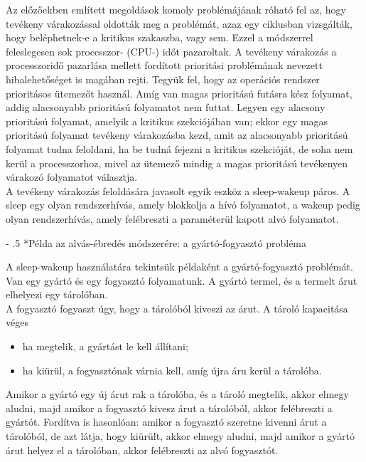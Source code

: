 \documentclass[tikz,12pt,margin=0px]{article}
\makeatletter
\renewcommand\paragraph{%
	\@startsection{paragraph}{4}{0mm}%
	{-\baselineskip}%
	{.5\baselineskip}%
	{\normalfont\normalsize\bfseries}}
\makeatother
\begin{document}
    Az előzőekben említett megoldások komoly problémájának róható fel az, hogy tevékeny várakozással oldották meg a problémát, azaz egy ciklusban vizsgálták, hogy beléphetnek-e a kritikus szakaszba, vagy sem. Ezzel a módszerrel feleslegesen sok processzor- (CPU-) időt pazaroltak. A tevékeny várakozás a processzoridő pazarlása mellett fordított prioritási problémának nevezett hibalehetőséget is magában rejti. Tegyük fel, hogy az operációs rendszer prioritásos ütemezőt használ. Amíg van magas prioritású futásra kész folyamat, addig alacsonyabb prioritású folyamatot nem futtat. Legyen egy alacsony prioritású folyamat, amelyik a kritikus szekciójában van; ekkor egy magas prioritású folyamat tevékeny várakozásba kezd, amit az alacsonyabb prioritású folyamat tudna feloldani, ha be tudná fejezni a kritikus szekcióját, de soha nem kerül a processzorhoz, mivel az ütemező mindig a magas prioritású tevékenyen várakozó folyamatot választja.\\

    \noindent A tevékeny várakozás feloldására javasolt egyik eszköz a sleep-wakeup páros. A sleep egy olyan rendszerhívás, amely blokkolja a hívó folyamatot, a wakeup pedig olyan rendszerhívás, amely felébreszti a paraméterül kapott alvó folyamatot.

    \paragraph*{Példa az alvás-ébredés módszerére: a gyártó-fogyasztó probléma}

    A sleep-wakeup használatára tekintsük példaként a gyártó-fogyasztó problémát. Van egy gyártó és egy fogyasztó folyamatunk. A gyártó termel, és a termelt árut elhelyezi egy tárolóban.\\ A fogyasztó fogyaszt úgy, hogy a tárolóból kiveszi az árut. A tároló kapacitása véges
    \begin{itemize}
        \item ha megtelik, a gyártást le kell állítani;
        \item ha kiürül, a fogyasztónak várnia kell, amíg újra áru kerül a tárolóba.
    \end{itemize}

    \noindent Amikor a gyártó egy új árut rak a tárolóba, és a tároló megtelik, akkor elmegy aludni, majd amikor a fogyasztó kivesz árut a tárolóból, akkor felébreszti a gyártót. Fordítva is hasonlóan: amikor a fogyasztó szeretne kivenni árut a tárolóból, de azt látja, hogy kiürült, akkor elmegy aludni, majd amikor a gyártó árut helyez el a tárolóban, akkor felébreszti az alvó fogyasztót.\\
\end{document}
